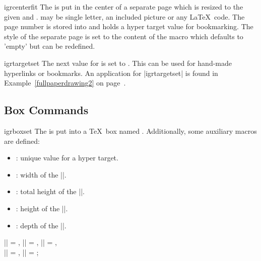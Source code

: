 \documentclass[a4paper,11pt]{ltxdoc}
\begin{document}
\begin{docCommand}{igrcenterfit}{}
  The  is put in the center of a separate page which
  is resized to the given  and .
   may be single letter, an
  included picture or any \LaTeX\ code.
  The page number is stored into  and
   holds a hyper target value for bookmarking.
  The style of the separate page is set to
  the content of the macro
   which defaults to 'empty' but can be
  redefined.
\end{docCommand}


\begin{docCommand}{igrtargetset}{}
  The next value for  is set to .
  This can be used for hand-made hyperlinks or bookmarks.
  An application for |igrtargetset| is found in Example~\ref{fullpaperdrawing2}
  on page~\pageref{fullpaperdrawing2}.
\end{docCommand}

\clearpage
\subsection{Box Commands}

\begin{docCommand}{igrboxset}{}
  The  is put into a \TeX\ box named .
  Additionally, some auxiliary macros are defined:
  \begin{itemize}
  \item{}: unique value for a hyper target.
  \item{}: width of the |\igrbox|.
  \item{}: total height of the |\igrbox|.
  \item{}: height of the |\igrbox|.
  \item{}: depth of the |\igrbox|.
  \end{itemize}
\begin{dispExample}
  |\igrAutoTarget| = \igrAutoTarget, |\igrBoxWidth| = \igrBoxWidth,
  |\igrBoxHeight| = \igrBoxHeight,\\
  |\igrBoxht| = \igrBoxht, |\igrBoxdp| = \igrBoxdp;
\end{dispExample}
\end{docCommand}
\end{document}
